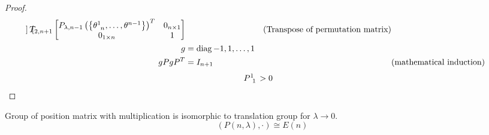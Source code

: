 \documentclass[../main.tex]{subfiles}
\begin{document}
\begin{proof}
\begin{align*}
\begin{bmatrix}
\end{bmatrix}
T_{2,n+1}
\begin{bmatrix}
P_{\lambda,n-1}\left(\left\{\tensor{\theta}{^1_{n}},\dots,\tensor{\theta}{^{n-1}}\right\}\right)^T&0_{n\times 1}\\
0_{1\times n}&1\\
\end{bmatrix}
&&\text{(Transpose of permutation matrix)}\\
g
&=\diag{-1,1,\dots,1}\\
gPgP^T
&=I_{n+1}&&\text{(mathematical induction)}
\end{align*}
\begin{align*}
\tensor{P}{^1_1}&> 0
\end{align*}
\end{proof}
\begin{proposition}
Group of position matrix with multiplication is isomorphic to translation group for $\lambda\to0$.
\begin{equation*}
\left(P\left(n,\lambda\right),\cdot\right)\cong E\left(n\right)
\end{equation*}
\end{proposition}
\end{document}

